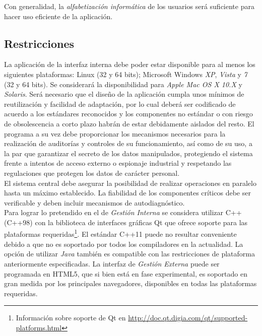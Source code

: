 \documentclass[11pt, a4paper, twoside, titlepage]{article}
\begin{document}
			Con generalidad, la \textit{alfabetización informática} de los usuarios será suficiente para hacer uso eficiente de la aplicación.

		\subsection{Restricciones}

			La aplicación de la interfaz interna debe poder estar disponible para al menos los siguientes plataformas: \gls{Linux} (32 y 64 bits); \gls{Microsoft Windows} \textit{XP},  \textit{Vista} y \textit{7} (32 y 64 bits). Se considerará la disponibilidad para \textit{Apple Mac OS X 10.X} y \textit{Solaris}. Será necesario que el diseño de la aplicación cumpla unos mínimos de reutilización y facilidad de adaptación, por lo cual deberá ser codificado de acuerdo a los estándares reconocidos y los componentes no estándar o con riesgo de obsolescencia a corto plazo habrán de estar debidamente aislados del resto. El programa a su vez debe proporcionar los mecanismos necesarios para la realización de auditorías y controles de su funcionamiento, así como de su uso, a la par que garantizar el secreto de los datos manipulados, protegiendo el sistema frente a intentos de acceso externo o espionaje industrial y respetando las regulaciones que protegen los datos de carácter personal.\\

			El sistema \software central debe asegurar la posibilidad de realizar operaciones en paralelo hasta un máximo establecido. La fiabilidad de los componentes críticos debe ser verificable y deben incluir mecanismos de autodiagnóstico.\\

			Para lograr lo pretendido en el \software de \textit{Gestión Interna} se considera utilizar \gls{C++} (C++98) con la biblioteca de interfaces gráficas \gls{Qt} que ofrece soporte para las plataformas requeridas\footnote{Información sobre soporte de Qt en \url{http://doc.qt.digia.com/qt/supported-platforms.html}}. El estándar C++11 puede no resultar conveniente debido a que no es soportado por todos los compiladores en la actualidad. La opción de utilizar \textit{Java} también es compatible con las restricciones de plataforma anteriormente especificadas. La interfaz de \textit{Gestión Externa} puede ser programada en \gls{HTML5}, que si bien está en fase experimental, es soportado en gran medida por los principales navegadores, disponibles en todas las plataformas requeridas.
\end{document}
